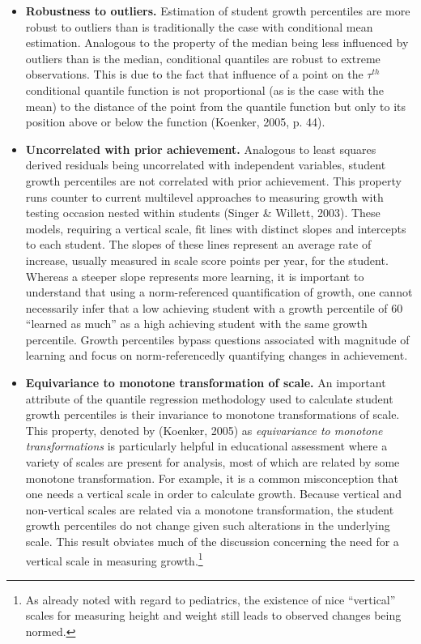 \documentclass[12pt]{article}
\begin{document}
\begin{itemize}
\itemsep1pt\parskip0pt
\item
  \textbf{Robustness to outliers.} Estimation of student growth
  percentiles are more robust to outliers than is traditionally the case
  with conditional mean estimation. Analogous to the property of the
  median being less influenced by outliers than is the median,
  conditional quantiles are robust to extreme observations. This is due
  to the fact that influence of a point on the \(\tau\)\(^{th}\)
  conditional quantile function is not proportional (as is the case with
  the mean) to the distance of the point from the quantile function but
  only to its position above or below the function (Koenker, 2005, p.
  44).
\item
  \textbf{Uncorrelated with prior achievement.} Analogous to least
  squares derived residuals being uncorrelated with independent
  variables, student growth percentiles are not correlated with prior
  achievement. This property runs counter to current multilevel
  approaches to measuring growth with testing occasion nested within
  students (Singer \& Willett, 2003). These models, requiring a vertical
  scale, fit lines with distinct slopes and intercepts to each student.
  The slopes of these lines represent an average rate of increase,
  usually measured in scale score points per year, for the student.
  Whereas a steeper slope represents more learning, it is important to
  understand that using a norm-referenced quantification of growth, one
  cannot necessarily infer that a low achieving student with a growth
  percentile of 60 ``learned as much'' as a high achieving student with
  the same growth percentile. Growth percentiles bypass questions
  associated with magnitude of learning and focus on norm-referencedly
  quantifying changes in achievement.\\
\item
  \textbf{Equivariance to monotone transformation of scale.} An
  important attribute of the quantile regression methodology used to
  calculate student growth percentiles is their invariance to monotone
  transformations of scale. This property, denoted by (Koenker, 2005) as
  \emph{equivariance to monotone transformations} is particularly
  helpful in educational assessment where a variety of scales are
  present for analysis, most of which are related by some monotone
  transformation. For example, it is a common misconception that one
  needs a vertical scale in order to calculate growth. Because vertical
  and non-vertical scales are related via a monotone transformation, the
  student growth percentiles do not change given such alterations in the
  underlying scale. This result obviates much of the discussion
  concerning the need for a vertical scale in measuring
  growth.\footnote{As already noted with regard to pediatrics, the
    existence of nice ``vertical'' scales for measuring height and
    weight still leads to observed changes being normed.}
\end{itemize}
\end{document}
